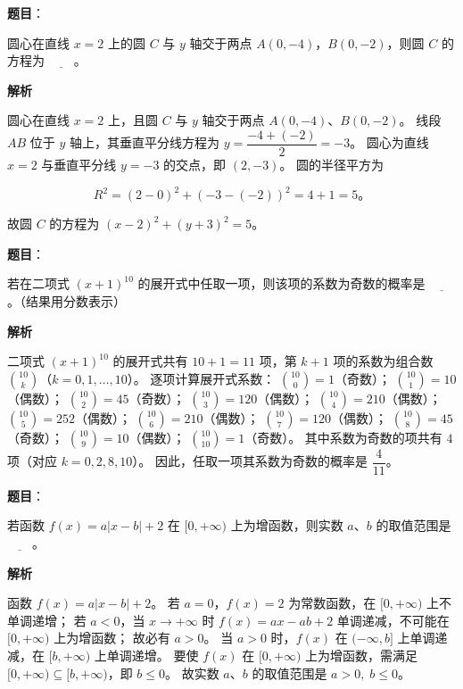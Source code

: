 \begin{answer}

\textbf{题目}：

圆心在直线 $x = 2$ 上的圆 $C$ 与 $y$ 轴交于两点 $A(0, -4)$，$B(0, -2)$，则圆 $C$ 的方程为 $\underline{\qquad}$。

\textbf{解析}

圆心在直线 $x = 2$ 上，且圆 $C$ 与 $y$ 轴交于两点 $A(0, -4)$、$B(0, -2)$。
线段 $AB$ 位于 $y$ 轴上，其垂直平分线方程为 $y = \dfrac{-4 + (-2)}{2} = -3$。
圆心为直线 $x = 2$ 与垂直平分线 $y = -3$ 的交点，即 $(2, -3)$。
圆的半径平方为

\nopagebreak[4]
\[
R^2 = (2 - 0)^2 + (-3 - (-2))^2 = 4 + 1 = 5\mbox{。}
\]

故圆 $C$ 的方程为 $(x - 2)^2 + (y + 3)^2 = 5$。


\end{answer}
\begin{answer}

\textbf{题目}：

若在二项式 $(x + 1)^{10}$ 的展开式中任取一项，则该项的系数为奇数的概率是 $\underline{\qquad}$。（结果用分数表示）

\textbf{解析}

二项式 $(x + 1)^{10}$ 的展开式共有 $10 + 1 = 11$ 项，第 $k+1$ 项的系数为组合数 $\binom{10}{k}$（$k = 0, 1, \dots, 10$）。
逐项计算展开式系数：
$\binom{10}{0} = 1$（奇数）；
$\binom{10}{1} = 10$（偶数）；
$\binom{10}{2} = 45$（奇数）；
$\binom{10}{3} = 120$（偶数）；
$\binom{10}{4} = 210$（偶数）；
$\binom{10}{5} = 252$（偶数）；
$\binom{10}{6} = 210$（偶数）；
$\binom{10}{7} = 120$（偶数）；
$\binom{10}{8} = 45$（奇数）；
$\binom{10}{9} = 10$（偶数）；
$\binom{10}{10} = 1$（奇数）。
其中系数为奇数的项共有 $4$ 项（对应 $k = 0, 2, 8, 10$）。
因此，任取一项其系数为奇数的概率是 $\dfrac{4}{11}$。


\end{answer}
\begin{answer}

\textbf{题目}：

若函数 $f(x) = a|x - b| + 2$ 在 $[0, +\infty)$ 上为增函数，则实数 $a$、$b$ 的取值范围是 $\underline{\qquad}$。

\textbf{解析}

函数 $f(x) = a|x - b| + 2$。
若 $a = 0$，$f(x) = 2$ 为常数函数，在 $[0, +\infty)$ 上不单调递增；
若 $a < 0$，当 $x \to +\infty$ 时 $f(x) = ax - ab + 2$ 单调递减，不可能在 $[0, +\infty)$ 上为增函数；
故必有 $a > 0$。
当 $a > 0$ 时，$f(x)$ 在 $(-\infty, b]$ 上单调递减，在 $[b, +\infty)$ 上单调递增。
要使 $f(x)$ 在 $[0, +\infty)$ 上为增函数，需满足 $[0, +\infty) \subseteq [b, +\infty)$，即 $b \leqslant 0$。
故实数 $a$、$b$ 的取值范围是 $a > 0,\; b \leqslant 0$。


\end{answer}
